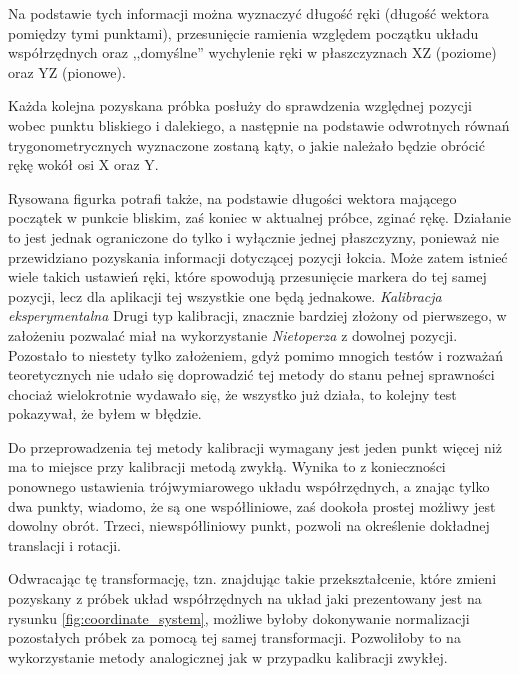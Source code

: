 Na podstawie tych informacji można wyznaczyć długość ręki (długość wektora pomiędzy tymi punktami), przesunięcie ramienia względem początku układu współrzędnych oraz ,,domyślne'' wychylenie ręki w płaszczyznach XZ (poziome) oraz YZ (pionowe).

Każda kolejna pozyskana próbka posłuży do sprawdzenia względnej pozycji wobec punktu bliskiego i dalekiego, a następnie na podstawie odwrotnych równań trygonometrycznych wyznaczone zostaną kąty, o jakie należało będzie obrócić rękę wokół osi X oraz Y.

Rysowana figurka potrafi także, na podstawie długości wektora mającego początek w punkcie bliskim, zaś koniec w aktualnej próbce, zginać rękę. Działanie to jest jednak ograniczone do tylko i wyłącznie jednej płaszczyzny, ponieważ nie przewidziano pozyskania informacji dotyczącej pozycji łokcia. Może zatem istnieć wiele takich ustawień ręki, które spowodują przesunięcie markera do tej samej pozycji, lecz dla aplikacji tej wszystkie one będą jednakowe.
\newline
\newline
\textsl{Kalibracja eksperymentalna} Drugi typ kalibracji, znacznie bardziej złożony od pierwszego, w założeniu pozwalać miał na wykorzystanie \textsl{Nietoperza} z dowolnej pozycji. Pozostało to niestety tylko założeniem, gdyż pomimo mnogich testów i rozważań teoretycznych nie udało się doprowadzić tej metody do stanu pełnej sprawności \ppauza chociaż wielokrotnie wydawało się, że wszystko już działa, to kolejny test pokazywał, że byłem w błędzie.

Do przeprowadzenia tej metody kalibracji wymagany jest jeden punkt więcej niż ma to miejsce przy kalibracji metodą zwykłą. Wynika to z konieczności ponownego ustawienia trójwymiarowego układu współrzędnych, a znając tylko dwa punkty, wiadomo, że są one współliniowe, zaś dookoła prostej możliwy jest dowolny obrót. Trzeci, niewspółliniowy punkt, pozwoli na określenie dokładnej translacji i rotacji.

Odwracając tę transformację, tzn. znajdując takie przekształcenie, które zmieni pozyskany z próbek układ współrzędnych na układ jaki prezentowany jest na rysunku \ref{fig:coordinate_system}, możliwe byłoby dokonywanie normalizacji pozostałych próbek za pomocą tej samej transformacji. Pozwoliłoby to na wykorzystanie metody analogicznej jak w przypadku kalibracji zwykłej.

